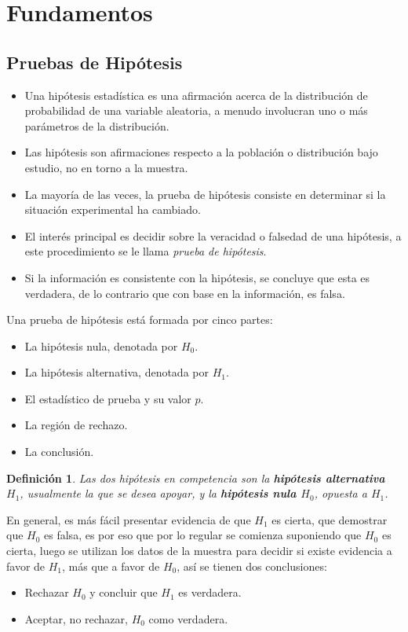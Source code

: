 \documentclass[a4paper]{report} %
\newtheorem{Def}{Definición}[chapter]
\begin{document}
\section{Fundamentos}

\subsection{Pruebas de Hipótesis}

\begin{itemize}
    \item Una hipótesis estadística es una afirmación acerca de la distribución de probabilidad de una variable aleatoria, a menudo involucran uno o más parámetros de la distribución.
    \item Las hipótesis son afirmaciones respecto a la población o distribución bajo estudio, no en torno a la muestra.
    \item La mayoría de las veces, la prueba de hipótesis consiste en determinar si la situación experimental ha cambiado.
    \item El interés principal es decidir sobre la veracidad o falsedad de una hipótesis, a este procedimiento se le llama \textit{prueba de hipótesis}.
    \item Si la información es consistente con la hipótesis, se concluye que esta es verdadera, de lo contrario que con base en la información, es falsa.
\end{itemize}

Una prueba de hipótesis está formada por cinco partes:
\begin{itemize}
    \item La hipótesis nula, denotada por $H_{0}$.
    \item La hipótesis alternativa, denotada por $H_{1}$.
    \item El estadístico de prueba y su valor $p$.
    \item La región de rechazo.
    \item La conclusión.
\end{itemize}

\begin{Def}
Las dos hipótesis en competencia son la \textbf{hipótesis alternativa $H_{1}$}, usualmente la que se desea apoyar, y la \textbf{hipótesis nula $H_{0}$}, opuesta a $H_{1}$.
\end{Def}
En general, es más fácil presentar evidencia de que $H_{1}$ es cierta, que demostrar que $H_{0}$ es falsa, es por eso que por lo regular se comienza suponiendo que $H_{0}$ es cierta, luego se utilizan los datos de la muestra para decidir si existe evidencia a favor de $H_{1}$, más que a favor de $H_{0}$, así se tienen dos conclusiones:
\begin{itemize}
    \item Rechazar $H_{0}$ y concluir que $H_{1}$ es verdadera.
    \item Aceptar, no rechazar, $H_{0}$ como verdadera.
\end{itemize}
\end{document}
